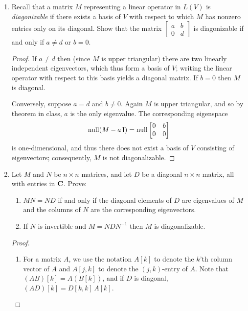 \documentclass[11pt]{amsart}
\begin{document}
\begin{enumerate}[(1)]
\begin{proof}
\begin{enumerate}
\end{enumerate}
\end{proof}

\item Recall that a matrix $M$ representing a linear operator in $L(V)$ is \emph{diagonizable} if there exists a basis of $V$ with respect to which $M$ has nonzero entries only on its diagonal.
Show that the matrix $\begin{bmatrix} a&b\\ 0&d \end{bmatrix}$ is diagonizable if and only if $a \ne d$ or $b=0$.

\begin{proof}
If $a \ne d$ then (since $M$ is upper triangular) there are two linearly independent eigenvectors, which thus form a basis of $V$; writing the linear operator with respect to this basis yields a diagonal matrix.
If $b=0$ then $M$ is diagonal.

Conversely, suppose $a=d$ and $b \ne 0$. Again $M$ is upper triangular, and so by theorem in class, $a$ is the only eigenvalue.
The corresponding eigenspace
\[
  \operatorname{null} (M - a \, \mathrm I) = \operatorname{null} \begin{bmatrix} 0&b\\ 0&0 \end{bmatrix}
\]
is one-dimensional, and thus there does not exist a basis of $V$ consisting of eigenvectors; consequently, $M$ is not diagonalizable.
\end{proof}

\item Let $M$ and $N$ be $n \times n$ matrices, and let $D$ be a diagonal $n \times n$ matrix, all with entries in $\mathbf{C}$. Prove:
  \begin{enumerate}
  \item $MN = ND$ if and only if the diagonal elements of $D$ are eigenvalues of $M$ and the columns of $N$ are the corresponding eigenvectors.
  \item If $N$ is invertible and $M = N D N^{ -1 }$ then $M$ is diagonalizable.
  \end{enumerate}

\begin{proof}
\begin{enumerate}

\item For a matrix $A$, we use the notation $A[k]$ to denote the $k$'th column vector of $A$ and $A[j,k]$ to denote the $(j,k)$-entry of $A$.
Note that $(AB)[k] = A(B[k])$, and if $D$ is diagonal, $(AD)[k] = D[k,k] \, A[k]$.


\end{enumerate}
\end{proof}
\end{enumerate}
\end{document}
